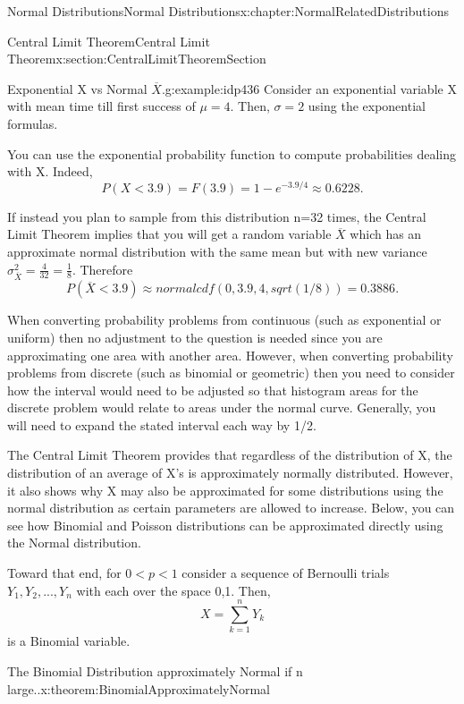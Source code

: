 \documentclass[oneside,10pt,]{book}
\numberwithin{equation}{section}
\newcommand{\lt}{<}
\begin{document}
\begin{chapterptx}{Normal Distributions}{}{Normal Distributions}{}{}{x:chapter:NormalRelatedDistributions}
\begin{sectionptx}{Central Limit Theorem}{}{Central Limit Theorem}{}{}{x:section:CentralLimitTheoremSection}
\begin{example}{Exponential X vs Normal \(\overline{X}\).}{g:example:idp436}
Consider an exponential variable X with mean time till first success of \(\mu = 4\).  Then, \(\sigma = 2\) using the exponential formulas.%
\par
You can use the exponential probability function to compute probabilities dealing with X. Indeed,%
\begin{equation*}
P(X \lt 3.9) = F(3.9) = 1 - e^{-3.9/4} \approx 0.6228 .
\end{equation*}
%
\par
If instead you plan to sample from this distribution n=32 times, the Central Limit Theorem implies that you will get a random variable \(\overline{X}\) which has an approximate normal distribution with the same mean but with new variance \(\sigma_{\overline{X}}^2 = \frac{4}{32} = \frac{1}{8}\).  Therefore%
\begin{equation*}
P( \overline{X} \lt 3.9 ) \approx normalcdf(0,3.9,4,sqrt(1/8)) = 0.3886 .
\end{equation*}
%
\end{example}
%
\par
When converting probability problems from continuous (such as exponential or uniform) then no adjustment to the question is needed since you are approximating one area with another area. However, when converting probability problems from discrete (such as binomial or geometric) then you need to consider how the interval would need to be adjusted so that histogram areas for the discrete problem would relate to areas under the normal curve. Generally, you will need to expand the stated interval each way by 1\slash{}2.%
\par
The Central Limit Theorem provides that regardless of the distribution of X, the distribution of an average of X's is approximately normally distributed. However, it also shows why X may also be approximated for some distributions using the normal distribution as certain parameters are allowed to increase. Below, you can see how Binomial and Poisson distributions can be approximated directly using the Normal distribution.%
\par
Toward that end, for \(0 \lt p \lt 1\) consider a sequence of Bernoulli trials \(Y_1, Y_2, ..., Y_n\) with each over the space \textbraceleft{}0,1\textbraceright{}. Then,%
\begin{equation*}
X = \sum_{k=1}^n Y_k
\end{equation*}
is a Binomial variable.%
\begin{theorem}{The Binomial Distribution approximately Normal if n large..}{}{x:theorem:BinomialApproximatelyNormal}%

\end{theorem}
\end{sectionptx}
\end{chapterptx}
\end{document}
